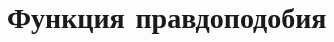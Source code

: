 \documentclass[../TV&MS.tex]{subfiles}
\begin{document}
\section{Функция правдоподобия}

\newpage
\end{document}
